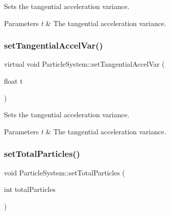 Sets the tangential acceleration variance.


\begin{DoxyParams}{Parameters}
{\em t} & The tangential acceleration variance. \\
\hline
\end{DoxyParams}
\mbox{\label{classParticleSystem_a30af52fffe71083cf3b87f89d980189b}} 
\subsubsection{\texorpdfstring{set\+Tangential\+Accel\+Var()}{setTangentialAccelVar()}\hspace{0.1cm}{\footnotesize\ttfamily [2/2]}}
{\footnotesize\ttfamily virtual void Particle\+System\+::set\+Tangential\+Accel\+Var (\begin{DoxyParamCaption}\item[{float}]{t }\end{DoxyParamCaption})\hspace{0.3cm}{\ttfamily [virtual]}}

Sets the tangential acceleration variance.


\begin{DoxyParams}{Parameters}
{\em t} & The tangential acceleration variance. \\
\hline
\end{DoxyParams}
\mbox{\label{classParticleSystem_ad406c6892022b3ec0173f1c940055ed3}} 
\subsubsection{\texorpdfstring{set\+Total\+Particles()}{setTotalParticles()}\hspace{0.1cm}{\footnotesize\ttfamily [1/2]}}
{\footnotesize\ttfamily void Particle\+System\+::set\+Total\+Particles (\begin{DoxyParamCaption}\item[{int}]{total\+Particles }\end{DoxyParamCaption})\hspace{0.3cm}{\ttfamily [virtual]}}

